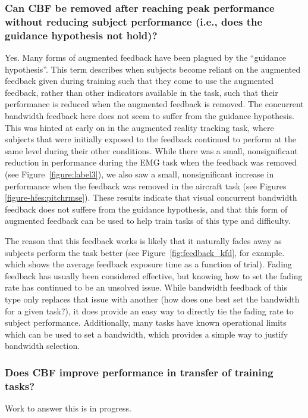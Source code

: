 \subsubsection{Can CBF be removed after reaching peak performance without reducing subject performance (i.e., does the guidance hypothesis not hold)?}
Yes.
Many forms of augmented feedback have been plagued by the ``guidance hypothesis''.
This term describes when subjects become reliant on the augmented feedback given during training such that they come to use the augmented feedback, rather than other indicators available in the task, such that their performance is reduced when the augmented feedback is removed.
The concurrent bandwidth feedback here does not seem to suffer from the guidance hypothesis.
This was hinted at early on in the augmented reality tracking task, where subjects that were initially exposed to the feedback continued to perform at the same level during their other conditions.
While there was a small, nonsignificant reduction in performance during the EMG task when the feedback was removed (see Figure~\ref{figure:label3}), we also saw a small, nonsignificant increase in performance when the feedback was removed in the aircraft task (see Figures \ref{figure-hfes:pitchrmse}).
These results indicate that visual concurrent bandwidth feedback does not suffere from the guidance hypothesis, and that this form of augmented feedback can be used to help train tasks of this type and difficulty.

The reason that this feedback works is likely that it naturally fades away as subjects perform the task better (see Figure~\ref{fig:feedback_kfd}, for example. which shows the average feedback exposure time as a function of trial).
Fading feedback has usually been considered effective, but knowing how to set the fading rate has continued to be an unsolved issue.
While bandwidth feedback of this type only replaces that issue with another (how does one best set the bandwidth for a given task?), it does provide an easy way to directly tie the fading rate to subject performance.
Additionally, many tasks have known operational limits which can be used to set a bandwidth, which provides a simple way to justify bandwidth selection.

\subsubsection{Does CBF improve performance in transfer of training tasks?}
Work to answer this is in progress.

